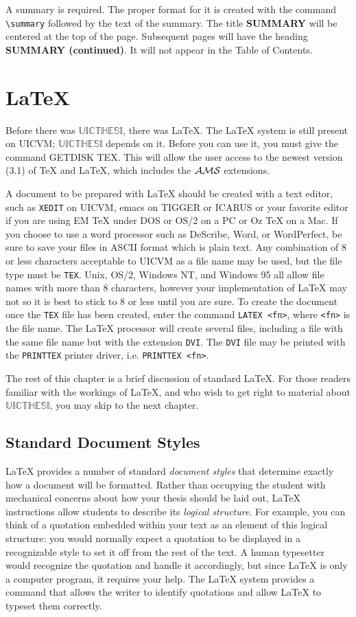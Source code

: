 \documentclass{uicthesi}
\newcommand{\ams}{{$\cal{A}\cal{M}\cal{S}$}}
\newcommand{\uicthesi}{{$\mathbb{UICTHESI}$}}
\begin{document}
\summary
A summary is required.
The proper format for it is created with the command \verb+\summary+
followed by the text of the summary.
The title {\bf SUMMARY} will be centered at the top of the page.
Subsequent pages will have the heading {\bf SUMMARY (continued)}.
It will not appear in the Table of Contents.
 
\chapter{\LaTeX{}}\label{sec:styles}
Before there was \uicthesi{}, there was \LaTeX{}.
The \LaTeX{} system is still present on UICVM; \uicthesi{}
depends on it.
Before you can use it, you must give the command GETDISK TEX.
This will allow the user access to the newest version (3.1) of
\TeX{} and \LaTeX{}, which includes the \ams{} extensions.
 
A document to be prepared with \LaTeX{} should be created
with a text editor, such as {\tt XEDIT} on UICVM, {\ttfamily
 emacs} on TIGGER or ICARUS or your favorite editor if you are
using EM \TeX{} under DOS or OS/2 on a PC or Oz \TeX{} on a Mac.
If you choose to use a word processor such as DeScribe, Word, or
WordPerfect, be sure to save your files in ASCII format which is
plain text.
Any combination of 8 or less characters acceptable to UICVM as
a file name may be used, but the file type must be {\tt TEX}. Unix,
OS/2, Windows NT, and Windows 95 all allow file names with more
than 8 characters, however your implementation of \LaTeX{} may not
so it is best to stick to 8 or less until you are sure.
To create the document once the {\tt TEX} file has been created,
enter the command \verb+LATEX <fn>+, where \verb+<fn>+ is the
file name.  The \LaTeX{} processor will create several files,
including a file with the same file name but with the extension
\verb+DVI+.  The \verb+DVI+ file may be printed with the
\verb+PRINTTEX+ printer driver, i.e.{} \verb+PRINTTEX <fn>+.
 
The rest of this chapter is a brief discussion of standard \LaTeX{}.
For those readers familiar with the workings of \LaTeX{}, and
who wish to get right to material about \uicthesi{}, you may
skip to the next chapter.
 
\section{Standard Document Styles}
\LaTeX{} provides a number of standard {\em document styles\/}
that determine exactly how a document will be formatted.
Rather than occupying the student with mechanical concerns about
how your thesis should be laid out, \LaTeX{} instructions allow students
to describe its {\em logical structure\/}.
For example, you can think of a quotation embedded within your
text as an element of this logical structure: you would normally expect
a quotation to be displayed in a recognizable style to set it
off from the rest of the text.
A human typesetter would recognize the quotation and handle
it accordingly, but since \LaTeX{} is only a computer program,
it requires your help.
The \LaTeX{} system provides a command that allows the writer to
identify quotations and allow \LaTeX{} to typeset them correctly.
 
\end{document}
